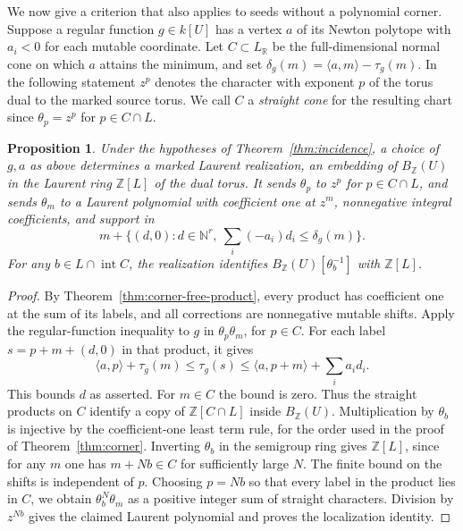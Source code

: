 \documentclass[11pt,reqno]{amsart}
\numberwithin{equation}{section}
\newtheorem{proposition}[theorem]{Proposition}
\theoremstyle{definition}
\theoremstyle{remark}
\begin{document}
We now give a criterion that also applies to seeds without a polynomial
corner. Suppose a regular function \(g\in k[U]\) has a
vertex \(a\) of its Newton polytope with \(a_i<0\) for each mutable
coordinate. Let \(C\subset L_{\mathbb R}\) be the full-dimensional
normal cone on which \(a\) attains the minimum, and set
\(\delta_g(m)=\langle a,m\rangle-\tau_g(m)\). In the following
statement \(z^p\) denotes the character with exponent \(p\) of the
torus dual to the marked source torus. We call \(C\) a \emph{straight cone}
for the resulting chart since \(\theta_p=z^p\) for \(p\in C\cap L\).

\begin{proposition}\label{prop:negative-vertex-chart}
Under the hypotheses of Theorem~\ref{thm:incidence}, a choice of \(g,a\)
as above determines a \emph{marked Laurent realization}, an embedding of
\(B_{\mathbb Z}(U)\) in the Laurent ring \(\mathbb Z[L]\) of the dual torus. It sends
\(\theta_p\) to \(z^p\) for \(p\in C\cap L\), and sends \(\theta_m\) to
a Laurent polynomial with coefficient one at \(z^m\), nonnegative
integral coefficients, and support in
\[ m+\bigl\{(d,0):d\in\mathbb N^r,\ \textstyle\sum_i(-a_i)d_i\le\delta_g(m)\bigr\}. \]
For any \(b\in L\cap\operatorname{int}C\), the realization identifies
\(B_{\mathbb Z}(U)[\theta_b^{-1}]\) with \(\mathbb Z[L]\).
\end{proposition}
\begin{proof}
By Theorem~\ref{thm:corner-free-product}, every product has
coefficient one at the sum of its labels, and all corrections are
nonnegative mutable shifts. Apply the regular-function
inequality to \(g\) in \(\theta_p\theta_m\), for \(p\in C\). For each
label \(s=p+m+(d,0)\) in that product, it gives
\[ \langle a,p\rangle+\tau_g(m)\le\tau_g(s) \le\langle a,p+m\rangle+\sum_i a_i d_i . \]
This bounds \(d\) as asserted. For \(m\in C\) the bound is zero.
Thus the straight products on \(C\) identify a copy of
\(\mathbb Z[C\cap L]\) inside \(B_{\mathbb Z}(U)\). Multiplication by \(\theta_b\) is
injective by the coefficient-one least term rule, for the order
used in the proof of Theorem~\ref{thm:corner}. Inverting \(\theta_b\)
in the semigroup ring gives \(\mathbb Z[L]\), since for any \(m\) one has
\(m+Nb\in C\) for sufficiently large \(N\).
The finite bound on the shifts is independent of \(p\). Choosing
\(p=Nb\) so that every label in the product lies in \(C\), we obtain
\(\theta_b^N\theta_m\) as a positive integer sum of straight
characters. Division by \(z^{Nb}\) gives the claimed Laurent
polynomial and proves the localization identity.
\end{proof}
\end{document}
